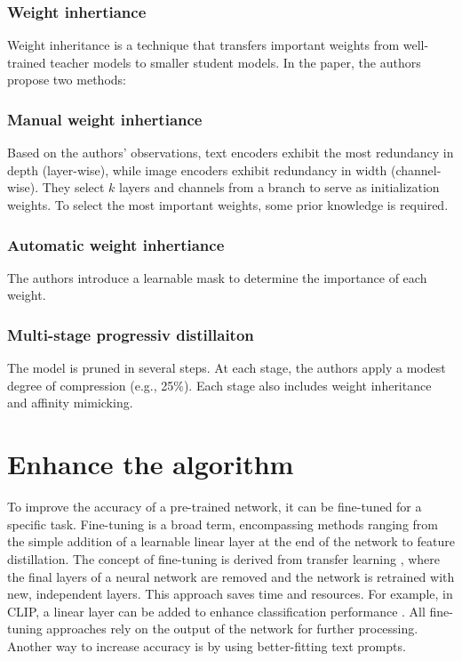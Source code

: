         \subsubsection{Weight inhertiance}
        Weight inheritance is a technique that transfers important weights from well-trained teacher models to smaller student models. 
        In the paper, the authors propose two methods:
        

        \subsubsection{Manual weight inhertiance}
        Based on the authors' observations, text encoders exhibit the most redundancy in depth (layer-wise), while image encoders exhibit redundancy in width (channel-wise). 
        They select \(k\) layers and channels from a branch to serve as initialization weights. 
        To select the most important weights, some prior knowledge is required.
        
        \subsubsection{Automatic weight inhertiance}
        The authors introduce a learnable mask to determine the importance of each weight.

        \subsubsection{Multi-stage progressiv distillaiton}
        The model is pruned in several steps. 
        At each stage, the authors apply a modest degree of compression (e.g., 25\%). Each stage also includes weight inheritance and affinity mimicking.
        

\section{Enhance the algorithm
    \label{section:enhancealgorithm}}

    To improve the accuracy of a pre-trained network, it can be fine-tuned for a specific task. 
    Fine-tuning is a broad term, encompassing methods ranging from the simple addition of a learnable linear layer at the end of the network to feature distillation. 
    The concept of fine-tuning is derived from transfer learning \cite{transferlearning}, where the final layers of a neural network are removed and the network is retrained with new, independent layers. 
    This approach saves time and resources. 
    For example, in CLIP, a linear layer can be added to enhance classification performance \cite{finetuneclip}. 
    All fine-tuning approaches rely on the output of the network for further processing. 
    Another way to increase accuracy is by using better-fitting text prompts.
    

